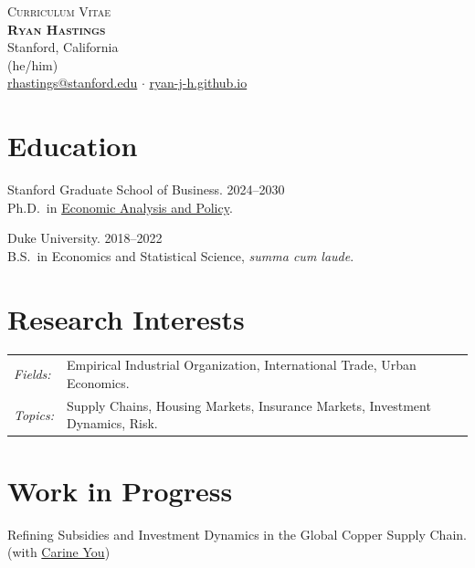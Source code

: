 \documentclass[11pt, letterpaper]{article}
\begin{document}
\begin{center}
    {\large \textsc{Curriculum Vitae}}\\[1ex]
    {\huge \textbf{\textsc{Ryan Hastings}}}\\[1ex]
    Stanford, California \\
    (he/him) \\
    \href{mailto:rhastings@stanford.edu}{rhastings@stanford.edu} \hspace{0.5em} $\cdot$ \hspace{0.5em} \href{https://ryan-j-h.github.io}{ryan-j-h.github.io}
\end{center}

\section*{Education}
Stanford Graduate School of Business. \hfill 2024--2030 \\
\hspace*{1.5em}Ph.D.\ in \href{https://www.gsb.stanford.edu/programs/phd/fields/economic-analysis-policy}{Economic Analysis and Policy}.

Duke University. \hfill 2018--2022 \\
\hspace*{1.5em}B.S.\ in Economics and Statistical Science, \textit{summa cum laude}.

\section*{Research Interests}
\begin{tabular}{@{}l l}
\textit{Fields:} & Empirical Industrial Organization, International Trade, Urban Economics.\\
\textit{Topics:} & Supply Chains, Housing Markets, Insurance Markets, Investment Dynamics, Risk.
\end{tabular}

\section*{Work in Progress}
Refining Subsidies and Investment Dynamics in the Global Copper Supply Chain. \\
\hspace*{1.5em}(with \href{https://www.gsb.stanford.edu/programs/phd/academic-experience/students/carine-you}{Carine You})
\end{document}
